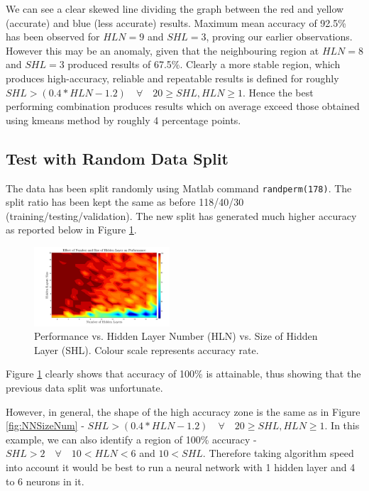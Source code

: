 \documentclass[10pt,twocolumn,letterpaper]{article}
\begin{document}
We can see a clear skewed line dividing the graph between the red and yellow (accurate) and blue (less accurate) results. Maximum mean accuracy of 92.5\% has been observed for $HLN = 9$ and $SHL = 3$, proving our earlier observations. However this may be an anomaly, given that the neighbouring region at $HLN = 8$ and $SHL = 3$ produced results of 67.5\%. Clearly a more stable region, which produces high-accuracy, reliable and repeatable results is defined for roughly $SHL > (0.4*HLN-1.2) \quad \forall \quad 20 \geq SHL, HLN \geq 1$. Hence the best performing combination produces results which on average exceed those obtained using kmeans method by roughly 4 percentage points.
\subsection{Test with Random Data Split}

The data has been split randomly using Matlab command {\tt\small randperm(178)}. The split ratio has been kept the same as before 118/40/30 (training/testing/validation). The new split has generated much higher accuracy as reported below in Figure \ref{fig:NewSplit}.

\begin{figure}[H]
\centering
\includegraphics[width=0.45\textwidth]{../results/NN2_2}
\caption{Performance vs. Hidden Layer Number (HLN) vs. Size of Hidden Layer (SHL). Colour scale represents accuracy rate.
\label{fig:NewSplit}}
\end{figure}
  
Figure \ref{fig:NewSplit} clearly shows that accuracy of 100\% is attainable, thus showing that the previous data split was unfortunate.

However, in general, the shape of the high accuracy zone is the same as in Figure \ref{fig:NNSizeNum} - $SHL > (0.4*HLN-1.2) \quad \forall \quad 20 \geq SHL, HLN \geq 1$. In this example, we can also identify a region of 100\% accuracy - $SHL > 2 \quad \forall \quad  10 < HLN < 6$ and $10 < SHL$. Therefore taking algorithm speed into account it would be best to run a neural network with 1 hidden layer and 4 to 6 neurons in it.
\end{document}
